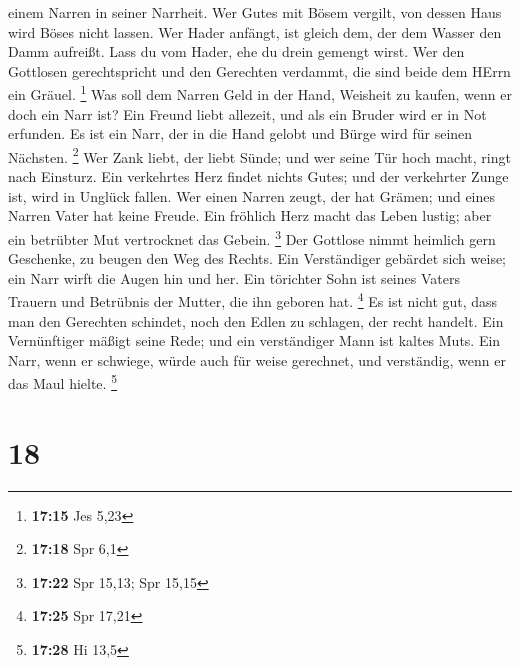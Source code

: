 einem Narren in seiner Narrheit.  Wer Gutes mit Bösem
vergilt, von dessen Haus wird Böses nicht lassen.  Wer
Hader anfängt, ist gleich dem, der dem Wasser den Damm aufreißt. Lass du
vom Hader, ehe du drein gemengt wirst.  Wer den Gottlosen
gerechtspricht und den Gerechten verdammt, die sind beide dem HErrn ein
Gräuel. \footnote{\textbf{17:15} Jes 5,23}  Was soll dem
Narren Geld in der Hand, Weisheit zu kaufen, wenn er doch ein Narr ist?
 Ein Freund liebt allezeit, und als ein Bruder wird er in
Not erfunden.  Es ist ein Narr, der in die Hand gelobt und
Bürge wird für seinen Nächsten. \footnote{\textbf{17:18} Spr 6,1}
 Wer Zank liebt, der liebt Sünde; und wer seine Tür hoch
macht, ringt nach Einsturz.  Ein verkehrtes Herz findet
nichts Gutes; und der verkehrter Zunge ist, wird in Unglück fallen.
 Wer einen Narren zeugt, der hat Grämen; und eines Narren
Vater hat keine Freude.  Ein fröhlich Herz macht das Leben
lustig; aber ein betrübter Mut vertrocknet das Gebein. \footnote{\textbf{17:22}
  Spr 15,13; Spr 15,15}  Der Gottlose nimmt heimlich gern
Geschenke, zu beugen den Weg des Rechts.  Ein Verständiger
gebärdet sich weise; ein Narr wirft die Augen hin und her. 
Ein törichter Sohn ist seines Vaters Trauern und Betrübnis der Mutter,
die ihn geboren hat. \footnote{\textbf{17:25} Spr 17,21} 
Es ist nicht gut, dass man den Gerechten schindet, noch den Edlen zu
schlagen, der recht handelt.  Ein Vernünftiger mäßigt seine
Rede; und ein verständiger Mann ist kaltes Muts.  Ein Narr,
wenn er schwiege, würde auch für weise gerechnet, und verständig, wenn
er das Maul hielte. \footnote{\textbf{17:28} Hi 13,5}

\hypertarget{section-7}{%
\section{18}\label{section-7}}

